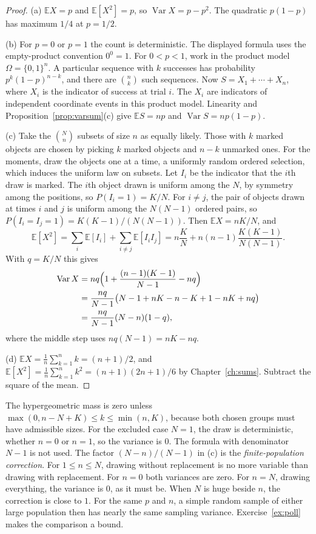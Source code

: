 \begin{proof}
(a) $\mathbb EX=p$ and $\mathbb E[X^2]=p$, so $\operatorname{Var}X=p-p^2$. The quadratic $p(1-p)$ has maximum $1/4$ at $p=1/2$.

(b) For $p=0$ or $p=1$ the count is deterministic. The displayed formula uses the empty-product convention $0^0=1$. For $0<p<1$, work in the product model $\Omega=\{0,1\}^n$. A particular sequence with $k$ successes has probability $p^k(1-p)^{n-k}$, and there are $\binom nk$ such sequences. Now $S=X_1+\cdots+X_n$, where $X_i$ is the indicator of success at trial $i$. The $X_i$ are indicators of independent coordinate events in this product model. Linearity and Proposition~\ref{prop:varsum}(c) give $\mathbb ES=np$ and $\operatorname{Var}S=np(1-p)$.

(c) Take the $\binom Nn$ subsets of size $n$ as equally likely. Those with $k$ marked objects are chosen by picking $k$ marked objects and $n-k$ unmarked ones. For the moments, draw the objects one at a time, a uniformly random ordered selection, which induces the uniform law on subsets. Let $I_i$ be the indicator that the $i$th draw is marked. The $i$th object drawn is uniform among the $N$, by symmetry among the positions, so $P(I_i=1)=K/N$. For $i\ne j$, the pair of objects drawn at times $i$ and $j$ is uniform among the $N(N-1)$ ordered pairs, so $P(I_i=I_j=1)=K(K-1)/(N(N-1))$. Then $\mathbb EX=nK/N$, and
\[
 \mathbb E[X^2]=\sum_i\mathbb E[I_i]+\sum_{i\ne j}\mathbb E[I_i I_j]
 =n\frac KN+n(n-1)\frac{K(K-1)}{N(N-1)}.
\]
With $q=K/N$ this gives
\[
\begin{aligned}
\operatorname{Var}X
&=nq\Bigl(1+\frac{(n-1)(K-1)}{N-1}-nq\Bigr)\\
&=\frac{nq}{N-1}\bigl(N-1+nK-n-K+1-nK+nq\bigr)\\
&=\frac{nq}{N-1}(N-n)(1-q),
\end{aligned}
\]
where the middle step uses $nq(N-1)=nK-nq$.

(d) $\mathbb EX=\frac1n\sum_{k=1}^n k=(n+1)/2$, and $\mathbb E[X^2]=\frac1n\sum_{k=1}^n k^2=(n+1)(2n+1)/6$ by Chapter~\ref{ch:sums}. Subtract the square of the mean.
\end{proof}

The hypergeometric mass is zero unless $\max(0,n-N+K)\le k\le\min(n,K)$, because both chosen groups must have admissible sizes. For the excluded case $N=1$, the draw is deterministic, whether $n=0$ or $n=1$, so the variance is $0$. The formula with denominator $N-1$ is not used. The factor $(N-n)/(N-1)$ in (c) is the \emph{finite-population correction}. For $1\le n\le N$, drawing without replacement is no more variable than drawing with replacement. For $n=0$ both variances are zero. For $n=N$, drawing everything, the variance is $0$, as it must be. When $N$ is huge beside $n$, the correction is close to $1$. For the same $p$ and $n$, a simple random sample of either large population then has nearly the same sampling variance. Exercise~\ref{ex:poll} makes the comparison a bound.


